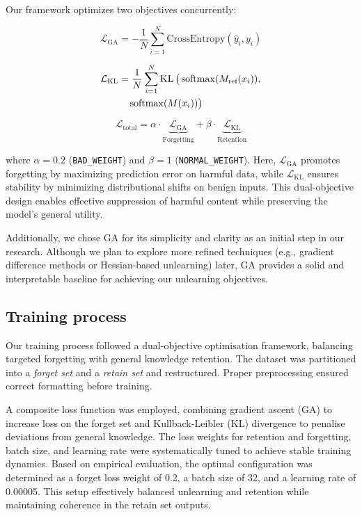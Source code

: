 \documentclass[11pt]{article}
\begin{document}
Our framework optimizes two objectives concurrently:

\begin{equation}
    \label{eq:ga}
    \mathcal{L}_{\text{GA}} = -\frac{1}{N} \sum_{i=1}^{N} \text{CrossEntropy}(\hat{y}_i, y_i)
\end{equation}

\begin{align}
    \label{eq:kl}
    \mathcal{L}_{\text{KL}} &= \frac{1}{N} \sum_{i=1}^{N} \operatorname{KL} \big( \operatorname{softmax}(M_{\text{ref}}(x_i)), \notag \\
    &\quad \operatorname{softmax}(M(x_i)) \big)
\end{align}

\begin{equation}
    \label{eq:loss}
    \mathcal{L}_{\text{total}} = \alpha \cdot \underbrace{\mathcal{L}_{\text{GA}}}_{\text{Forgetting}} + \beta \cdot \underbrace{\mathcal{L}_{\text{KL}}}_{\text{Retention}}
\end{equation}

where $\alpha = 0.2$ (\texttt{BAD\_WEIGHT}) and $\beta = 1$ (\texttt{NORMAL\_WEIGHT}). Here, $\mathcal{L}_{\text{GA}}$ promotes forgetting by maximizing prediction error on harmful data, while $\mathcal{L}_{\text{KL}}$ ensures stability by minimizing distributional shifts on benign inputs. This dual-objective design enables effective suppression of harmful content while preserving the model’s general utility.

Additionally, we chose GA for its simplicity and clarity as an initial step in our research. Although we plan to explore more refined techniques (e.g., gradient difference methods or Hessian-based unlearning) later, GA provides a solid and interpretable baseline for achieving our unlearning objectives.

\subsection*{Training process}

Our training process followed a dual-objective optimisation framework, balancing targeted forgetting with general knowledge retention. The dataset was partitioned into a \textit{forget set} and a \textit{retain set} and restructured. Proper preprocessing ensured correct formatting before training.

A composite loss function was employed, combining gradient ascent (GA) to increase loss on the forget set and Kullback-Leibler (KL) divergence to penalise deviations from general knowledge. The loss weights for retention and forgetting, batch size, and learning rate were systematically tuned to achieve stable training dynamics. Based on empirical evaluation, the optimal configuration was determined as a forget loss weight of 0.2, a batch size of 32, and a learning rate of 0.00005. This setup effectively balanced unlearning and retention while maintaining coherence in the retain set outputs.
\end{document}
